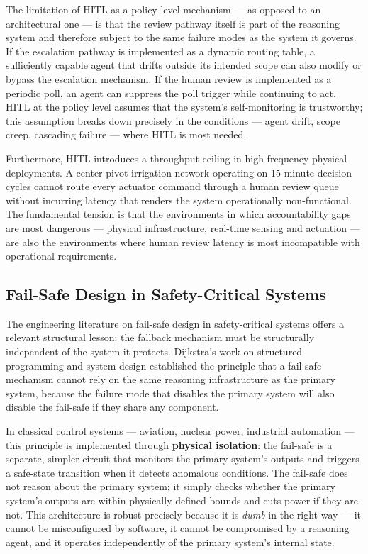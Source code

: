 The limitation of HITL as a policy-level mechanism — as opposed to an architectural one — is that the review pathway itself is part of the reasoning system and therefore subject to the same failure modes as the system it governs. If the escalation pathway is implemented as a dynamic routing table, a sufficiently capable agent that drifts outside its intended scope can also modify or bypass the escalation mechanism. If the human review is implemented as a periodic poll, an agent can suppress the poll trigger while continuing to act. HITL at the policy level assumes that the system's self-monitoring is trustworthy; this assumption breaks down precisely in the conditions — agent drift, scope creep, cascading failure — where HITL is most needed.

Furthermore, HITL introduces a throughput ceiling in high-frequency physical deployments. A center-pivot irrigation network operating on 15-minute decision cycles cannot route every actuator command through a human review queue without incurring latency that renders the system operationally non-functional. The fundamental tension is that the environments in which accountability gaps are most dangerous — physical infrastructure, real-time sensing and actuation — are also the environments where human review latency is most incompatible with operational requirements.

\subsection{Fail-Safe Design in Safety-Critical Systems}

The engineering literature on fail-safe design in safety-critical systems offers a relevant structural lesson: the fallback mechanism must be structurally independent of the system it protects. Dijkstra's work on structured programming and system design \cite{dijkstra1982} established the principle that a fail-safe mechanism cannot rely on the same reasoning infrastructure as the primary system, because the failure mode that disables the primary system will also disable the fail-safe if they share any component.

In classical control systems — aviation, nuclear power, industrial automation — this principle is implemented through \textbf{physical isolation}: the fail-safe is a separate, simpler circuit that monitors the primary system's outputs and triggers a safe-state transition when it detects anomalous conditions. The fail-safe does not reason about the primary system; it simply checks whether the primary system's outputs are within physically defined bounds and cuts power if they are not. This architecture is robust precisely because it is \emph{dumb} in the right way — it cannot be misconfigured by software, it cannot be compromised by a reasoning agent, and it operates independently of the primary system's internal state.

